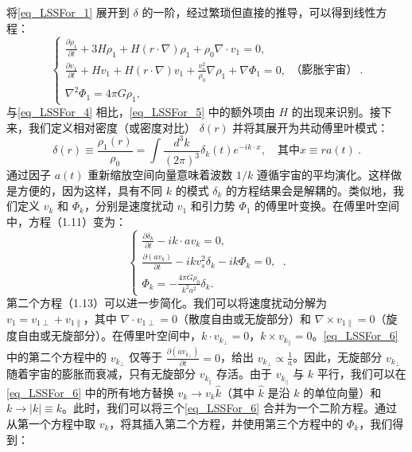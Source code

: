 将\autoref{eq_LSSFor_1} 展开到 \( \delta \) 的一阶，经过繁琐但直接的推导，可以得到线性方程：
\begin{equation}\label{eq_LSSFor_5}\begin{cases} 
\frac{\partial \rho_1}{\partial t} + 3H\rho_1 + H(r \cdot \nabla)\rho_1 + \rho_0\nabla \cdot v_1 = 0, \\
\frac{\partial v_1}{\partial t} + Hv_1 + H(r \cdot \nabla)v_1 + \frac{v_s^2}{\rho_0}\nabla\rho_1 + \nabla\Phi_1 = 0, \\
\nabla^2\Phi_1 = 4\pi G\rho_1,
\end{cases} \text{（膨胀宇宙）} ~.
\end{equation}
与\autoref{eq_LSSFor_4} 相比，\autoref{eq_LSSFor_5} 中的额外项由 $H$ 的出现来识别。接下来，我们定义相对密度（或密度对比） \( \delta(r) \) 并将其展开为共动傅里叶模式：
\[ \delta(r) \equiv \frac{\rho_1(r)}{\rho_0} = \int \frac{d^3k}{(2\pi)^3} \delta_k(t) e^{-ik \cdot x}, \quad \text{其中} x \equiv r a(t)~. \]
通过因子 \( a(t) \) 重新缩放空间向量意味着波数 \( 1/k \) 遵循宇宙的平均演化。这样做是方便的，因为这样，具有不同 \( k \) 的模式 \( \delta_k \) 的方程结果会是解耦的。类似地，我们定义 \( v_k \) 和 \( \Phi_k \)，分别是速度扰动 \( v_1 \) 和引力势 \( \Phi_1 \) 的傅里叶变换。在傅里叶空间中，方程（1.11）变为：
\begin{equation}\label{eq_LSSFor_6} \begin{cases} 
\frac{\partial \delta_k}{\partial t} - ik \cdot a v_k = 0, \\
\frac{\partial (a v_k)}{\partial t} - ik v_s^2 \delta_k - ik \Phi_k = 0, \\
\Phi_k = -\frac{4\pi G \rho_0}{k^2 a^2} \delta_k.
\end{cases} ~.
\end{equation}
第二个方程（1.13）可以进一步简化。我们可以将速度扰动分解为 \( v_1 = v_{1\perp} + v_{1\parallel} \)，其中 \( \nabla \cdot v_{1\perp} = 0 \)（散度自由或无旋部分）和 \( \nabla \times v_{1\parallel} = 0 \)（旋度自由或无旋部分）。在傅里叶空间中，\( k \cdot v_{k_\perp} = 0 \)，\( k \times v_{k_\parallel} = 0 \)。\autoref{eq_LSSFor_6} 中的第二个方程中的 \( v_{k_\perp} \) 仅等于 \( \frac{\partial (a v_{k_\perp})}{\partial t} = 0 \)，给出 \( v_{k_\perp} \propto \frac{1}{a} \)。因此，无旋部分 \( v_{k_\perp} \) 随着宇宙的膨胀而衰减，只有无旋部分 \( v_{k_\parallel} \) 存活。由于 \( v_{k_\parallel} \) 与 \( k \) 平行，我们可以在\autoref{eq_LSSFor_6} 中的所有地方替换 \( v_k \rightarrow v_k \hat{k} \)（其中 \( \hat{k} \) 是沿 \( k \) 的单位向量）和 \( k \rightarrow |k| \equiv k \)。此时，我们可以将三个\autoref{eq_LSSFor_6} 合并为一个二阶方程。通过从第一个方程中取 \( v_k \)，将其插入第二个方程，并使用第三个方程中的 \( \Phi_k \)，我们得到：

